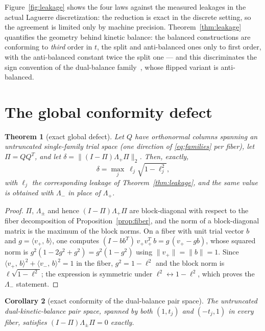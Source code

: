 \documentclass[11pt,reqno]{amsart}
\newtheorem{theorem}{Theorem}[section]
\newtheorem{corollary}[theorem]{Corollary}
\theoremstyle{definition}
\theoremstyle{remark}
\newcommand{\norm}[1]{\lVert #1\rVert}
\newcommand{\ip}[2]{\langle #1,\,#2\rangle}
\begin{document}
Figure~\ref{fig:leakage} shows the four laws against the measured
leakages in the actual Laguerre discretization: the reduction is exact
in the discrete setting, so the agreement is limited only by machine
precision. Theorem~\ref{thm:leakage} quantifies the geometry behind
kinetic balance: the balanced constructions are conforming to
\emph{third} order in $t$, the split and anti-balanced ones only to
first order, with the anti-balanced constant twice the split one --- and
this discriminates the sign convention of the dual-balance
family~\cite{Shabaev2004}, whose flipped variant is anti-balanced.

\section{The global conformity defect}\label{sec:defect}

\begin{theorem}[exact global defect]\label{thm:defect}
Let $Q$ have orthonormal columns spanning an untruncated single-family
trial space (one direction of \eqref{eq:families} per fiber), let
$\Pi=QQ^{T}$, and let
$\delta=\norm{(I-\Pi)\Lambda_{+}\Pi}_{2}$. Then, exactly,
\begin{equation}
\delta=\max_{j}\ \ell_{j}\sqrt{1-\ell_{j}^{2}},
\end{equation}
with $\ell_{j}$ the corresponding leakage of
Theorem~\ref{thm:leakage}, and the same value is obtained with
$\Lambda_{-}$ in place of $\Lambda_{+}$.
\end{theorem}

\begin{proof}
$\Pi$, $\Lambda_{\pm}$ and hence $(I-\Pi)\Lambda_{+}\Pi$ are
block-diagonal with respect to the fiber decomposition of
Proposition~\ref{prop:fiber}, and the norm of a block-diagonal matrix
is the maximum of the block norms. On a fiber with unit trial vector
$b$ and $g=\ip{v_{+}}{b}$, one computes
$(I-bb^{T})\,v_{+}v_{+}^{T}\,b=g\,(v_{+}-gb)$, whose squared norm is
$g^{2}(1-2g^{2}+g^{2})=g^{2}(1-g^{2})$ using $\norm{v_{+}}=\norm{b}=1$.
Since $\ip{v_{+}}{b}^{2}+\ip{v_{-}}{b}^{2}=1$ in the fiber,
$g^{2}=1-\ell^{2}$ and the block norm is $\ell\sqrt{1-\ell^{2}}$; the
expression is symmetric under $\ell^{2}\leftrightarrow1-\ell^{2}$,
which proves the $\Lambda_{-}$ statement.
\end{proof}

\begin{corollary}[exact conformity of the dual-balance pair space]
\label{cor:dkb}
The untruncated dual-kinetic-balance pair space, spanned by both
$(1,t_{j})$ and $(-t_{j},1)$ in every fiber, satisfies
$(I-\Pi)\Lambda_{\pm}\Pi=0$ exactly.
\end{corollary}
\end{document}
